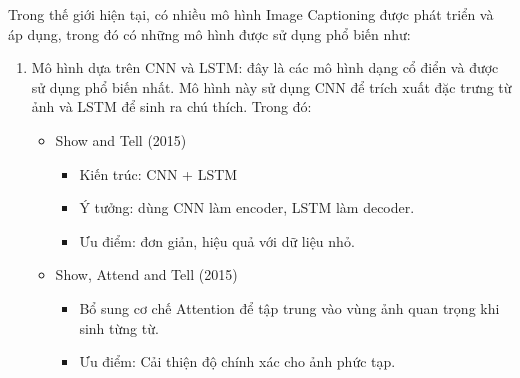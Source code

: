 \documentclass[../main.tex]{subfiles}
\begin{document}
Trong thế giới hiện tại, có nhiều mô hình Image Captioning được phát triển và áp dụng, trong đó có những mô hình được sử dụng phổ biến như:

\begin{enumerate}
    \item Mô hình dựa trên CNN và LSTM: đây là các mô hình dạng cổ điển và được sử dụng phổ biến nhất. Mô hình này sử dụng CNN để trích xuất đặc trưng từ ảnh và LSTM để sinh ra chú thích. Trong đó:
    \begin{itemize}
        \item Show and Tell (2015)
        \begin{itemize}
            \item Kiến trúc: CNN + LSTM
            \item Ý tưởng: dùng CNN làm encoder, LSTM làm decoder.
            \item Ưu điểm: đơn giản, hiệu quả với dữ liệu nhỏ.
        \end{itemize}

        \item Show, Attend and Tell (2015)
        \begin{itemize}
            \item Bổ sung cơ chế Attention để tập trung vào vùng ảnh quan trọng khi sinh từng từ.
            \item Ưu điểm: Cải thiện độ chính xác cho ảnh phức tạp.
        \end{itemize}


\end{itemize}
\end{enumerate}
\end{document}
